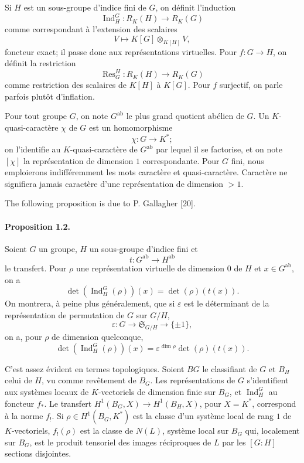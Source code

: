 \documentclass[10pt]{article}
\newcommand{\Ind}{\operatorname{Ind}}
\newcommand{\Res}{\operatorname{Res}}
\providecommand{\Ind}{\operatorname{Ind}}
\begin{document}
Si \(H\) est un sous-groupe d'indice fini de \(G\), on définit l'induction
\[
\Ind_H^G:R_K(H)\longrightarrow R_K(G)
\]
comme correspondant à l'extension des scalaires
\[
V\longmapsto K[G]\otimes_{K[H]}V,
\]
foncteur exact; il passe donc aux représentations virtuelles. Pour \(f:G\to H\), on définit la restriction
\[
\Res_G^H:R_K(H)\longrightarrow R_K(G)
\]
comme restriction des scalaires de \(K[H]\) à \(K[G]\). Pour \(f\) surjectif, on parle parfois plutôt d'inflation.

Pour tout groupe \(G\), on note \(G^{\mathrm{ab}}\) le plus grand quotient abélien de \(G\). Un \(K\)-quasi-caractère \(\chi\) de \(G\) est un homomorphisme
\[
\chi:G\longrightarrow K^*;
\]
on l'identifie au \(K\)-quasi-caractère de \(G^{\mathrm{ab}}\) par lequel il se factorise, et on note \([\chi]\) la représentation de dimension \(1\) correspondante. Pour \(G\) fini, nous emploierons indifféremment les mots caractère et quasi-caractère. Caractère ne signifiera jamais caractère d'une représentation de dimension \(>1\).

The following proposition is due to P. Gallagher [20].

\paragraph{Proposition 1.2.} Soient \(G\) un groupe, \(H\) un sous-groupe d'indice fini et
\[
t:G^{\mathrm{ab}}\longrightarrow H^{\mathrm{ab}}
\]
le transfert. Pour \(\rho\) une représentation virtuelle de dimension \(0\) de \(H\) et \(x\in G^{\mathrm{ab}}\), on a
\[
\det(\Ind_H^G(\rho))(x)=\det(\rho)(t(x)).
\]
On montrera, à peine plus généralement, que si \(\varepsilon\) est le déterminant de la représentation de permutation de \(G\) sur \(G/H\),
\[
\varepsilon:G\longrightarrow \mathfrak S_{G/H}\longrightarrow \{\pm1\},
\]
on a, pour \(\rho\) de dimension quelconque,
\[
\det(\Ind_H^G(\rho))(x)=\varepsilon^{\dim\rho}\det(\rho)(t(x)).
\]

C'est assez évident en termes topologiques. Soient \(BG\) le classifiant de \(G\) et \(B_H\) celui de \(H\), vu comme revêtement de \(B_G\). Les représentations de \(G\) s'identifient aux systèmes locaux de \(K\)-vectoriels de dimension finie sur \(B_G\), et \(\Ind_H^G\) au foncteur \(f_*\). Le transfert \(H^1(B_G,X)\to H^1(B_H,X)\), pour \(X=K^*\), correspond à la norme \(f_!\). Si \(\rho\in H^1(B_G,K^*)\) est la classe d'un système local de rang \(1\) de \(K\)-vectoriels, \(f_!(\rho)\) est la classe de \(N(L)\), système local sur \(B_G\) qui, localement sur \(B_G\), est le produit tensoriel des images réciproques de \(L\) par les \([G:H]\) sections disjointes.
\end{document}
